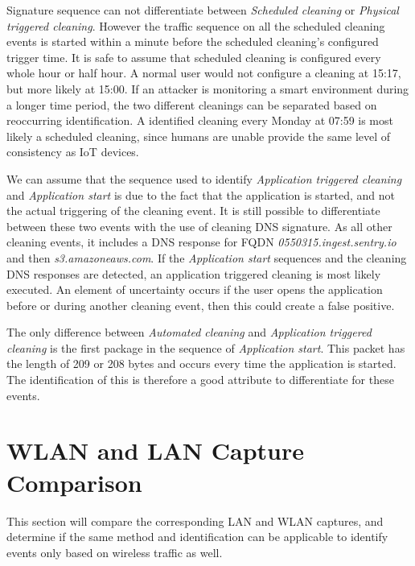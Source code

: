 Signature sequence can not differentiate between \textit{Scheduled cleaning} or \textit{Physical triggered cleaning}. However the traffic sequence on all the scheduled cleaning events is started within a minute before the scheduled cleaning's configured trigger time. It is safe to assume that scheduled cleaning is configured every whole hour or half hour. A normal user would not configure a cleaning at 15:17, but more likely at 15:00. If an attacker is monitoring a smart environment during a longer time period, the two different cleanings can be separated based on reoccurring identification. A identified cleaning every Monday at 07:59 is most likely a scheduled cleaning, since humans are unable provide the same level of consistency as IoT devices.

We can assume that the sequence used to identify \textit{Application triggered cleaning} and \textit{Application start} is due to the fact that the application is started, and not the actual triggering of the cleaning event. It is still possible to differentiate between these two events with the use of cleaning DNS signature. As all other cleaning events, it includes a DNS response for FQDN \textit{0550315.ingest.sentry.io} and then \textit{s3.amazoneaws.com}. If the \textit{Application start} sequences and the cleaning DNS responses are detected, an application triggered cleaning is most likely executed. An element of uncertainty occurs if the user opens the application before or during another cleaning event, then this could create a false positive. 

The only difference between \textit{Automated cleaning} and \textit{Application triggered cleaning} is the first package in the sequence of \textit{Application start}. This packet has the length of 209 or 208 bytes and occurs every time the application is started. The identification of this is therefore a good attribute to differentiate for these events.

\section{WLAN and LAN Capture Comparison}
This section will compare the corresponding LAN and WLAN captures, and determine if the same method and identification can be applicable to identify events only based on wireless traffic as well. 

